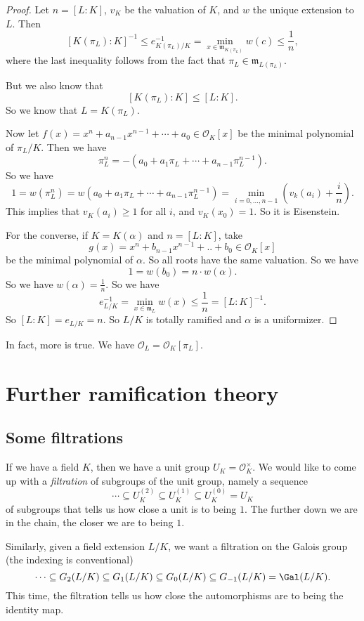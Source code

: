\documentclass[a4paper]{article}
\begin{document}
\begin{proof}
  Let $n = [L:K]$, $v_K$ be the valuation of $K$, and $w$ the unique extension to $L$. Then
  \[
    [K(\pi_L): K]^{-1} \leq e_{K(\pi_L)/K}^{-1} = \min_{x \in \mathfrak{m}_{K(\pi_L)}} w(c) \leq \frac{1}{n},
  \]
  where the last inequality follows from the fact that $\pi_L \in \mathfrak{m}_{L(\pi_L)}$.

  But we also know that
  \[
    [K(\pi_L):K] \leq [L:K].
  \]
  So we know that $L = K(\pi_L)$.

  Now let $f(x) = x^n + a_{n - 1} x^{n - 1} + \cdots + a_0 \in \mathcal{O}_K[x]$ be the minimal polynomial of $\pi_L/K$. Then we have
  \[
    \pi_L^n = -(a_0 + a_1 \pi_L + \cdots + a_{n - 1}\pi_L^{n - 1}).
  \]
  So we have
  \[
    1 = w(\pi_L^n) = w(a_0 + a_1 \pi_L + \cdots + a_{n - 1}\pi_L^{n - 1}) = \min_{i = 0, \ldots, n - 1} \left(v_k(a_i) + \frac{i}{n}\right).
  \]
  This implies that $v_K(a_i) \geq 1$ for all $i$, and $v_K(x_0) = 1$. So it is Eisenstein.

  For the converse, if $K = K(\alpha)$ and $n = [L:K]$, take
  \[
    g(x) = x^n + b_{n - 1} x^{n - 1} + .. + b_0 \in \mathcal{O}_K[x]
  \]
  be the minimal polynomial of $\alpha$. So all roots have the same valuation. So we have
  \[
    1 = w(b_0) = n \cdot w(\alpha).
  \]
  So we have $w(\alpha) = \frac{1}{n}$. So we have
  \[
    e_{L/K}^{-1} = \min_{x \in \mathfrak{m}_L} w(x) \leq \frac{1}{n} = [L:K]^{-1}.
  \]
  So $[L:K] = e_{L/K} = n$. So $L/K$ is totally ramified and $\alpha$ is a uniformizer.
\end{proof}
In fact, more is true. We have $\mathcal{O}_L = \mathcal{O}_K[\pi_L]$.

\section{Further ramification theory}
\subsection{Some filtrations}
If we have a field $K$, then we have a unit group $U_K = \mathcal{O}_K^\times$. We would like to come up with a \emph{filtration} of subgroups of the unit group, namely a sequence
\[
  \cdots \subseteq U_K^{(2)} \subseteq U_K^{(1)} \subseteq U_K^{(0)} = U_K
\]
of subgroups that tells us how close a unit is to being $1$. The further down we are in the chain, the closer we are to being $1$.

Similarly, given a field extension $L/K$, we want a filtration on the Galois group (the indexing is conventional)
\[
  \cdots\subseteq G_2(L/K) \subseteq G_1(L/K) \subseteq G_0(L/K) \subseteq G_{-1}(L/K) = \Gal(L/K).
\]
This time, the filtration tells us how close the automorphisms are to being the identity map.
\end{document}

